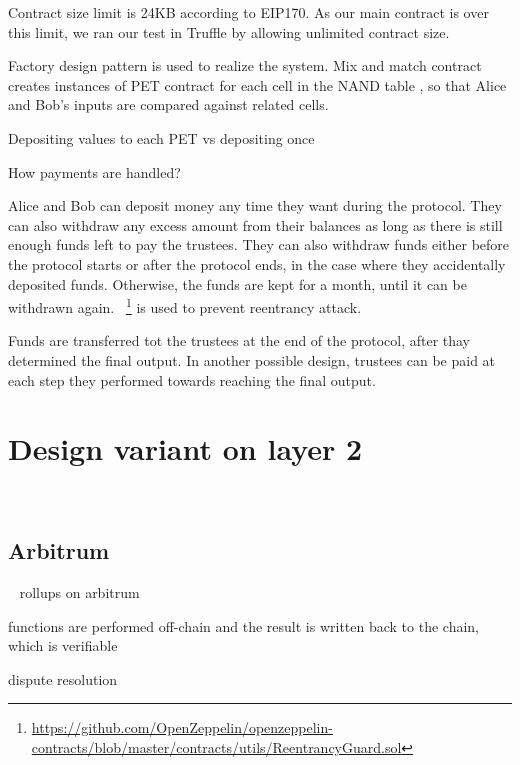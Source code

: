 Contract size limit is 24KB according to EIP170. As our main contract is over this limit, we ran our test in Truffle by allowing unlimited contract size.

Factory design pattern is used to realize the system. Mix and match contract creates instances of PET contract for each cell in the NAND table , so that Alice and Bob's inputs are compared against related cells.

Depositing values to each PET vs depositing once

How payments are handled? 

Alice and Bob can deposit money any time they want during the protocol. They can also withdraw any excess amount from their balances as long as there is still enough funds left to pay the trustees. They can also withdraw funds either before the protocol starts or after the protocol ends, in the case where they accidentally deposited funds. Otherwise, the funds are kept for a month, until it can be withdrawn again. ~\footnote{\url{https://github.com/OpenZeppelin/openzeppelin-contracts/blob/master/contracts/utils/ReentrancyGuard.sol}} is used to prevent reentrancy attack.

Funds are transferred tot the trustees at the end of the protocol, after thay determined the final output. In another possible design, trustees can be paid at each step they performed towards reaching the final output.


\section{Design variant on layer 2 }
\label{sec:arb}

~\subsection{Arbitrum}
~\cite{kalodner2018arbitrum}
rollups on arbitrum

functions are performed off-chain and the result is written back to the chain, which is verifiable

dispute resolution



